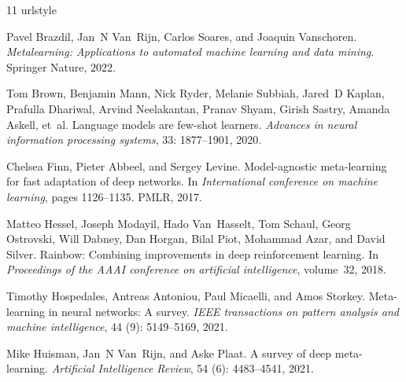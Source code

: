 \begin{thebibliography}{11}
\providecommand{\natexlab}[1]{#1}
\providecommand{\url}[1]{\texttt{#1}}
\expandafter\ifx\csname urlstyle\endcsname\relax
  \providecommand{\doi}[1]{doi: #1}\else
  \providecommand{\doi}{doi: \begingroup \urlstyle{rm}\Url}\fi

Pavel Brazdil, Jan~N Van~Rijn, Carlos Soares, and Joaquin Vanschoren.
\newblock \emph{Metalearning: Applications to automated machine learning and data mining}.
\newblock Springer Nature, 2022.

Tom Brown, Benjamin Mann, Nick Ryder, Melanie Subbiah, Jared~D Kaplan, Prafulla Dhariwal, Arvind Neelakantan, Pranav Shyam, Girish Sastry, Amanda Askell, et~al.
\newblock Language models are few-shot learners.
\newblock \emph{Advances in neural information processing systems}, 33: 1877--1901, 2020.

Chelsea Finn, Pieter Abbeel, and Sergey Levine.
\newblock Model-agnostic meta-learning for fast adaptation of deep networks.
\newblock In \emph{International conference on machine learning}, pages 1126--1135. PMLR, 2017.

Matteo Hessel, Joseph Modayil, Hado Van~Hasselt, Tom Schaul, Georg Ostrovski, Will Dabney, Dan Horgan, Bilal Piot, Mohammad Azar, and David Silver.
\newblock Rainbow: Combining improvements in deep reinforcement learning.
\newblock In \emph{Proceedings of the AAAI conference on artificial intelligence}, volume~32, 2018.

Timothy Hospedales, Antreas Antoniou, Paul Micaelli, and Amos Storkey.
\newblock Meta-learning in neural networks: A survey.
\newblock \emph{IEEE transactions on pattern analysis and machine intelligence}, 44 (9): 5149--5169, 2021.

Mike Huisman, Jan~N Van~Rijn, and Aske Plaat.
\newblock A survey of deep meta-learning.
\newblock \emph{Artificial Intelligence Review}, 54 (6): 4483--4541, 2021.


\end{thebibliography}
